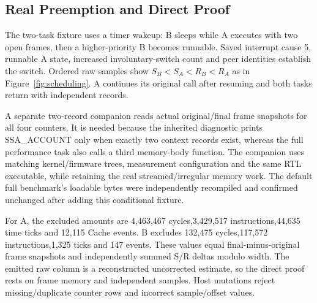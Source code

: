 \subsection{Real Preemption and Direct Proof}
The two-task fixture uses a timer wakeup: B sleeps while A executes with two open frames, then a higher-priority B becomes runnable. Saved interrupt cause 5, runnable A state, increased involuntary-switch count and peer identities establish the switch. Ordered raw samples show $S_B<S_A<R_B<R_A$ as in Figure~\ref{fig:scheduling}. A continues its original call after resuming and both tasks return with independent records.

A separate two-record companion reads actual original/final frame snapshots for all four counters. It is needed because the inherited diagnostic prints SSA\_ACCOUNT only when exactly two context records exist, whereas the full performance task also calls a third memory-body function. The companion uses matching kernel/firmware trees, measurement configuration and the same RTL executable, while retaining the real streamed/irregular memory work. The default full benchmark's loadable bytes were independently recompiled and confirmed unchanged after adding this conditional fixture.

For A, the excluded amounts are 4,463,467 cycles,3,429,517 instructions,44,635 time ticks and 12,115 Cache events. B excludes 132,475 cycles,117,572 instructions,1,325 ticks and 147 events. These values equal final-minus-original frame snapshots and independently summed S/R deltas modulo width. The emitted raw column is a reconstructed uncorrected estimate, so the direct proof rests on frame memory and independent samples. Host mutations reject missing/duplicate counter rows and incorrect sample/offset values.
